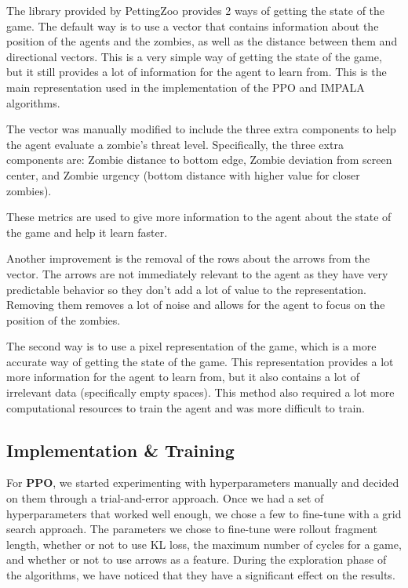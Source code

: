 \documentclass[12pt,a4paper, onecolumn]{exam}
\begin{document}
The library provided by PettingZoo provides 2 ways of getting the state of the game. The default way is to use a vector that contains
information about the position of the agents and the zombies, as well as the distance between them and directional vectors.
This is a very simple way of getting the state of the game, but it still provides a lot of information for the agent to learn from.
This is the main representation used in the implementation of the PPO and IMPALA algorithms.

The vector was manually modified to include the three extra components to help the agent evaluate a zombie's threat level. Specifically, the three extra components are:
Zombie distance to bottom edge, Zombie deviation from screen center, and Zombie urgency (bottom distance with higher value for closer zombies).

These metrics are used to give more information to the agent about the state of the game and help it learn faster. %

Another improvement is the removal of the rows about the arrows from the vector. The arrows are not immediately relevant to the agent as they have very predictable behavior so they don't add a lot of value
to the representation. Removing them removes a lot of noise and allows for the agent to focus on the position of the zombies.

The second way is to use a pixel representation of the game, which is a more accurate way of getting the state of the game. This representation provides a lot more information for the agent to learn from,
but it also contains a lot of irrelevant data (specifically empty spaces). This method also required a lot more computational resources to train the agent and was more difficult to train.

\subsection{Implementation \& Training}

For \textbf{PPO}, we started experimenting with hyperparameters manually and decided on them through a trial-and-error approach.
Once we had a set of hyperparameters that worked well enough, we chose a few to fine-tune with a grid search approach.
The parameters we chose to fine-tune were rollout fragment length, whether or not to use KL loss, the maximum number of cycles for a game, and whether or not to use arrows as a feature.
During the exploration phase of the algorithms, we have noticed that they have a significant effect on the results.
\end{document}
